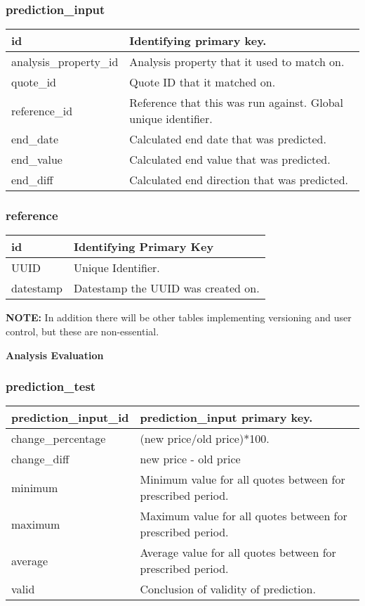 \subsubsection{prediction\_input}
\begin{tabular}{|l||l|}
	\hline
	id							& Identifying primary key. \\ \hline
	analysis\_property\_id 		& Analysis property that it used to match on. \\ \hline
	quote\_id					& Quote ID that it matched on. \\ \hline
	reference\_id				& Reference that this was run against. Global unique identifier. \\ \hline
	end\_date					& Calculated end date that was predicted. \\ \hline
	end\_value					& Calculated end value that was predicted. \\ \hline
	end\_diff					& Calculated end direction that was predicted. \\ \hline
\end{tabular}



\subsubsection{reference}
\begin{tabular}{|l||l|}
	\hline
	id						& Identifying Primary Key \\ \hline
	UUID					& Unique Identifier. \\ \hline
	datestamp				& Datestamp the UUID was created on. \\ \hline
\end{tabular}

\textbf{NOTE:} In addition there will be other tables implementing versioning and user control, but these are non-essential.



\par \textbf{Analysis Evaluation}
\subsubsection{prediction\_test}
\begin{tabular}{|l||l|}
	\hline
	prediction\_input\_id	& prediction\_input primary key. \\ \hline
	change\_percentage		& (new price/old price)*100. \\ \hline
	change\_diff			& new price - old price \\ \hline
	minimum					& Minimum value for all quotes between for prescribed period. \\ \hline
	maximum					& Maximum value for all quotes between for prescribed period. \\ \hline
	average					& Average value for all quotes between for prescribed period.\\ \hline
	valid					& Conclusion of validity of prediction. \\ \hline
\end{tabular}

